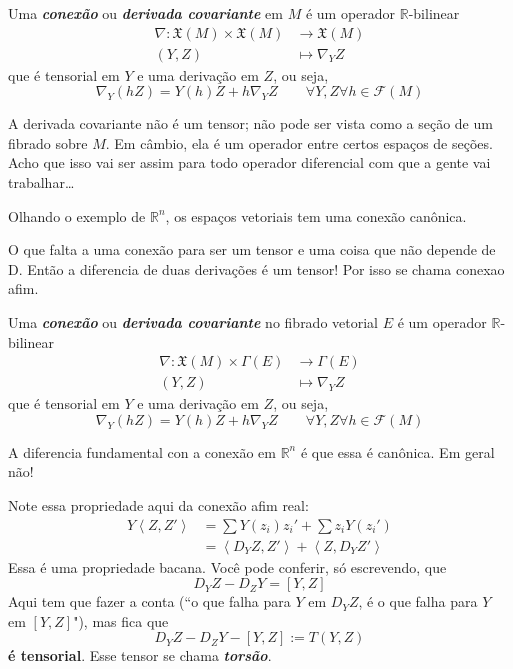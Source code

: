 \begin{defn}\leavevmode
Uma \textit{\textbf{conexão}} ou \textit{\textbf{derivada covariante}} em \(M\) é um operador \(\mathbb{R}\)-bilinear
\begin{align*}
	\nabla: \mathfrak{X}(M) \times \mathfrak{X}(M) &\longrightarrow \mathfrak{X}(M) \\
	(Y,Z) &\longmapsto \nabla_YZ
\end{align*}
que é tensorial em \(Y\) e uma derivação em \(Z\), ou seja,
\[\nabla_Y(hZ)=Y(h)Z+h\nabla_YZ\qquad  \forall  Y,Z \forall h \in \mathcal{F}(M)\]
\end{defn}

\begin{remark}[dani]\leavevmode
A derivada covariante não é um tensor; não pode ser vista como a seção de um fibrado sobre \(M\). Em câmbio, ela é um operador entre certos espaços de seções. Acho que isso vai ser assim para todo operador diferencial com que a gente vai trabalhar…
\end{remark}

Olhando o exemplo de \(\mathbb{R}^n\), os espaços vetoriais tem uma conexão canônica.

O que falta a uma conexão para ser um tensor e uma coisa que não depende de D. Então a diferencia de duas derivações é um tensor! Por isso se chama conexao afim.

\begin{defn}\leavevmode
Uma \textit{\textbf{conexão}} ou \textit{\textbf{derivada covariante}} no fibrado vetorial \(E\) é um operador \(\mathbb{R}\)-bilinear
\begin{align*}
	\nabla: \mathfrak{X}(M) \times \Gamma(E) &\longrightarrow \Gamma(E) \\
	(Y,Z) &\longmapsto \nabla_YZ
\end{align*}
que é tensorial em \(Y\) e uma derivação em \(Z\), ou seja,
\[\nabla_Y(hZ)=Y(h)Z+h\nabla_YZ\qquad  \forall  Y,Z \forall h \in \mathcal{F}(M)\]
\end{defn}

A diferencia fundamental con a conexão em \(\mathbb{R}^n\) é que essa é canônica. Em geral não!

Note essa propriedade aqui da conexão afim real:
\begin{align*}
Y\left<Z,Z'\right>&=\sum Y(z_i)z_i'+\sum z_i Y(z_i')\\
&=\left<D_YZ,Z'\right>+\left<Z,D_YZ'\right>
\end{align*}
Essa é uma propriedade bacana. Você pode conferir, só escrevendo, que
\[D_YZ-D_ZY=[Y,Z]\]
Aqui tem que fazer a conta (``o que falha para \(Y\) em  \(D_YZ\),  é o que falha para \(Y\) em \([Y,Z]\)"), mas fica que
\[D_YZ-D_ZY-[Y,Z]:=T(Y,Z)\]
\textbf{é tensorial}. Esse tensor se chama \textit{\textbf{torsão}}.

